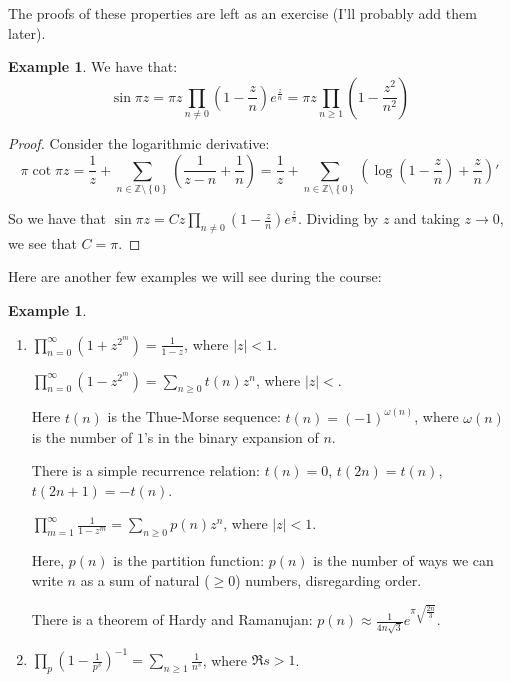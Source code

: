 \documentclass[11pt]{article} %
\theoremstyle{definition}
\newtheorem{example}[theorem]{Example}
\newcommand{\abs}[1]{\left|#1\right|}
\begin{document}
The proofs of these properties are left as an exercise (I'll probably add them later).

\begin{example}
We have that:
\[ \sin \pi z = \pi z \prod_{n\neq 0}\left(1 - \frac{z}{n}\right)e^{\frac{z}{n}} = \pi z \prod _{n\geq 1} \left(1 - \frac{z^2}{n^2}\right)\]
\end{example}

\begin{proof}
Consider the logarithmic derivative:
\[ \pi \cot \pi z = \frac{1}{z} + \sum _{n\in \mathbb{Z}\setminus\left\{0\right\}}\left(\frac{1}{z-n} + \frac{1}{n}\right) = \frac{1}{z} + \sum_{n\in \mathbb{Z}\setminus\left\{0\right\}} \left(\log \left(1- \frac{z}{n}\right) + \frac{z}{n}\right)'\]

So we have that $\sin \pi z = C z \prod_{n\neq 0}\left(1 - \frac{z}{n}\right)e^{\frac{z}{n}}$. Dividing by $z$ and taking $z \to 0$, we see that $C = \pi$.
\end{proof}

Here are another few examples we will see during the course:

\begin{example}
\begin{enumerate}
\item $\prod_{n=0}^\infty \left(1 + z^{2^m}\right) = \frac{1}{1-z}$, where $\abs{z} < 1$.
\begin{item}
$\prod_{n=0}^\infty \left(1 - z^{2^m}\right) = \sum_{n\geq 0} t\left(n\right) z^n$, where $\abs{z} < $.

Here $t\left(n\right)$ is the Thue-Morse sequence: $t\left(n\right) = \left(-1\right)^{\omega\left(n\right)}$, where $\omega\left(n\right)$ is the number of $1$'s in the binary expansion of $n$.

There is a simple recurrence relation: $t\left(n\right) = 0$, $t\left(2n\right) = t\left(n\right)$, $t\left(2n+1\right) = -t\left(n\right)$.
\end{item}

\begin{item}
$\prod_{m=1}^\infty \frac{1}{1- z^m} = \sum_{n \geq 0}p\left(n\right)z^n$, where $\abs{z} < 1$.

Here, $p\left(n\right)$ is the partition function: $p\left(n\right)$ is the number of ways we can write $n$ as a sum of natural ($\geq 0$) numbers, disregarding order.

There is a theorem of Hardy and Ramanujan: $p\left(n\right) \approx \frac{1}{4n\sqrt{3}} e^{\pi\sqrt{\frac{2n}{3}}}$.
\end{item}

\item $\prod_p \left(1-\frac{1}{p^s}\right)^{-1} = \sum_{n \geq 1} \frac{1}{n^s}$, where $\Re s > 1$.
\end{enumerate}
\end{example}
\end{document}
